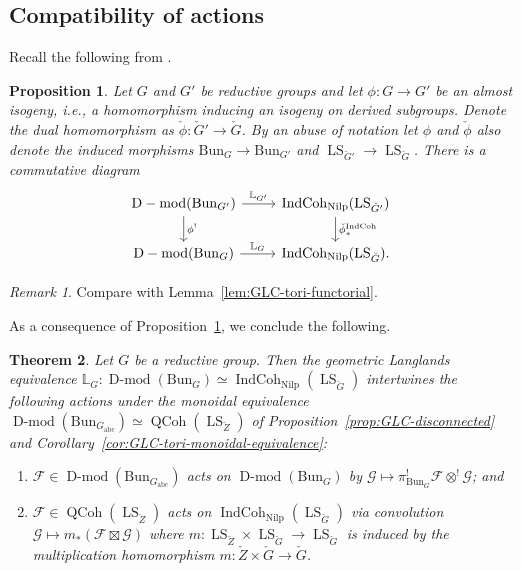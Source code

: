 \documentclass[11pt]{amsart}
\newcommand{\cF}{\mathcal{F}}
\newcommand{\cG}{\mathcal{G}}
\newcommand{\Bun}{{\mathrm{Bun}}}
\newcommand{\abc}{{\mathrm{abc}}}
\newcommand{\Nilp}{\mathrm{Nilp}}
\DeclareMathOperator{\QCoh}{QCoh}
\DeclareMathOperator{\Dmod}{D-mod}
\DeclareMathOperator{\IndCoh}{IndCoh}
\DeclareMathOperator{\LS}{LS}
\newtheorem{thm}{Theorem}[section]
\newtheorem{prop}[thm]{Proposition}
\theoremstyle{remark}
\newtheorem*{remark}{Remark}
\theoremstyle{definition}
\begin{document}
\subsection{Compatibility of actions}
Recall the following from \cite[Proposition~2.1.6]{GLC5}.
\begin{prop}\label{prop:compatibility-with-isogeny}
    Let $G$ and $G'$ be reductive groups and let $\phi\colon G\to G'$ be an almost isogeny, i.e., a homomorphism inducing an isogeny on derived subgroups. Denote the dual homomorphism as $\check\phi\colon\check G'\to\check G$. By an abuse of notation let $\phi$ and $\check\phi$ also denote the induced morphisms $\Bun_G\to\Bun_{G'}$ and $\LS_{\check G'}\to\LS_{\check G}$. There is a commutative diagram
    \[
    \begin{tikzcd}
        \Dmod(\Bun_{G'})\arrow{r}{\mathbb L_{G'}}\arrow{d}{\phi^!}&\IndCoh_\Nilp(\LS_{\check G'})\arrow{d}{\check\phi_*^{\IndCoh}}\\
        \Dmod(\Bun_{G})\arrow{r}{\mathbb L_G}&\IndCoh_\Nilp(\LS_{\check G}).
    \end{tikzcd}
    \]
\end{prop}
\begin{remark}
    Compare with Lemma~\ref{lem:GLC-tori-functorial}.
\end{remark}
As a consequence of Proposition~\ref{prop:compatibility-with-isogeny}, we conclude the following.
\begin{thm}\label{thm:GLC-intertwines-actions}
    Let $G$ be a reductive group. Then the geometric Langlands equivalence $\mathbb L_G\colon\Dmod(\Bun_G)\simeq\IndCoh_\Nilp(\LS_{\check G})$ intertwines the following actions under the monoidal equivalence $\Dmod(\Bun_{G_{\abc}})\simeq\QCoh(\LS_{\check Z})$ of Proposition~\ref{prop:GLC-disconnected} and Corollary~\ref{cor:GLC-tori-monoidal-equivalence}:
    \begin{enumerate}
        \item $\cF\in\Dmod(\Bun_{G_{\abc}})$ acts on $\Dmod(\Bun_G)$ by $\cG\mapsto\pi_{\Bun_G}^!\cF\otimes^!\cG$; and
        \item $\cF\in\QCoh(\LS_{\check Z})$ acts on $\IndCoh_\Nilp(\LS_{\check G})$ via convolution $\cG\mapsto m_*(\cF\boxtimes\cG)$ where $m\colon\LS_{\check Z}\times\LS_{\check G}\to\LS_{\check G}$ is induced by the multiplication homomorphism $m\colon\check Z\times\check G\to\check G$. 
    \end{enumerate}
\end{thm}
\end{document}
